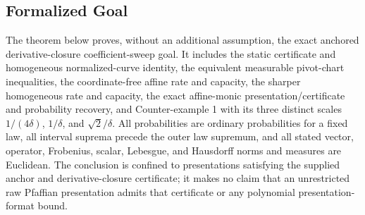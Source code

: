 \subsection{Formalized Goal}\label{sec:formalized-goal}
The theorem below proves, without an additional assumption, the exact anchored derivative-closure
coefficient-sweep goal. It includes the static certificate and homogeneous normalized-curve identity, the
equivalent measurable pivot-chart inequalities, the coordinate-free affine rate and capacity, the sharper
homogeneous rate and capacity, the exact affine-monic presentation/certificate and probability recovery, and
Counter-example 1 with its three distinct scales $1/(4\delta)$, $1/\delta$, and $\sqrt2/\delta$. All
probabilities are ordinary probabilities for a fixed law, all interval suprema precede the outer law supremum,
and all stated vector, operator, Frobenius, scalar, Lebesgue, and Hausdorff norms and measures are Euclidean.
The conclusion is confined to presentations satisfying the supplied anchor and derivative-closure certificate;
it makes no claim that an unrestricted raw Pfaffian presentation admits that certificate or any polynomial
presentation-format bound.
